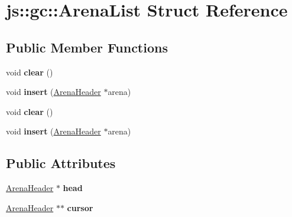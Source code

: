 \hypertarget{structjs_1_1gc_1_1_arena_list}{\section{js\-:\-:gc\-:\-:Arena\-List Struct Reference}
\label{structjs_1_1gc_1_1_arena_list}
}
\subsection*{Public Member Functions}
\begin{DoxyCompactItemize}
\item 
\hypertarget{structjs_1_1gc_1_1_arena_list_a111d8531acf1f97fa94f337ec54b3f37}{void {\bfseries clear} ()}\label{structjs_1_1gc_1_1_arena_list_a111d8531acf1f97fa94f337ec54b3f37}

\item 
\hypertarget{structjs_1_1gc_1_1_arena_list_ae6f6ea9e754867a1af083868b20906e6}{void {\bfseries insert} (\hyperlink{structjs_1_1gc_1_1_arena_header}{Arena\-Header} $\ast$arena)}\label{structjs_1_1gc_1_1_arena_list_ae6f6ea9e754867a1af083868b20906e6}

\item 
\hypertarget{structjs_1_1gc_1_1_arena_list_a111d8531acf1f97fa94f337ec54b3f37}{void {\bfseries clear} ()}\label{structjs_1_1gc_1_1_arena_list_a111d8531acf1f97fa94f337ec54b3f37}

\item 
\hypertarget{structjs_1_1gc_1_1_arena_list_ae6f6ea9e754867a1af083868b20906e6}{void {\bfseries insert} (\hyperlink{structjs_1_1gc_1_1_arena_header}{Arena\-Header} $\ast$arena)}\label{structjs_1_1gc_1_1_arena_list_ae6f6ea9e754867a1af083868b20906e6}

\end{DoxyCompactItemize}
\subsection*{Public Attributes}
\begin{DoxyCompactItemize}
\item 
\hypertarget{structjs_1_1gc_1_1_arena_list_a16505120a84e84fdf710419f24a094f9}{\hyperlink{structjs_1_1gc_1_1_arena_header}{Arena\-Header} $\ast$ {\bfseries head}}\label{structjs_1_1gc_1_1_arena_list_a16505120a84e84fdf710419f24a094f9}

\item 
\hypertarget{structjs_1_1gc_1_1_arena_list_ad8238ff1f3fb282bf70002fc57e54cdd}{\hyperlink{structjs_1_1gc_1_1_arena_header}{Arena\-Header} $\ast$$\ast$ {\bfseries cursor}}\label{structjs_1_1gc_1_1_arena_list_ad8238ff1f3fb282bf70002fc57e54cdd}

\end{DoxyCompactItemize}


